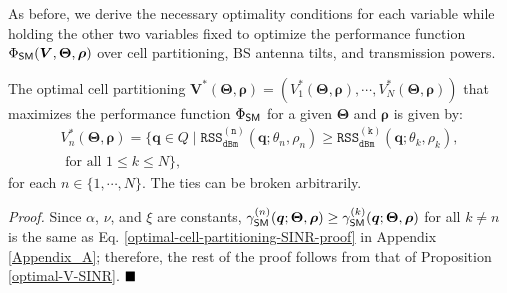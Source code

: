 As before, we derive the necessary optimality conditions for each variable while holding the other two variables fixed to optimize the performance function $\Phi_{{\sf SM}}(\bm{V}, \mathbf{\Theta}, \bm{\rho})$ over cell partitioning, BS antenna tilts, and transmission powers.
\begin{Proposition}\label{optimal-cell-partitioning-SM-performance}
    The optimal cell partitioning $\bm{V}^*(\bm{\Theta}, \bm{\rho}) = \left(V_1^*(\bm{\Theta}, \bm{\rho}), \cdots, V_N^*(\bm{\Theta}, \bm{\rho}) \right)$ that maximizes the performance function $\Phi_{{\sf SM}}$ for a given $\bm{\Theta}$ and $\bm{\rho}$ is given by:
\begin{multline}\label{optimal-cell-partitioning-SM}
   \!\!\!\!\! V_n^*(\bm{\Theta}, \bm{\rho}) = \big\{\bm{q} \in Q \mid \mathtt{RSS_{dBm}^{(n)}}(\bm{q}; \theta_n, \rho_n) \geq \mathtt{RSS_{dBm}^{(k)}}(\bm{q}; \theta_k, \rho_k), \\ \textrm{ for all } 1 \leq k \leq N \big\},
\end{multline}  
for each $n \in \{1, \cdots, N\}$. The ties can be broken arbitrarily.
\end{Proposition}
\textit{Proof. }
Since $\alpha$, $\nu$, and $\xi$ are constants, $\gamma_{\sf SM}^{(n)}(\bm{q}; \mathbf{\Theta}, \bm{\rho}) \geq \gamma_{\sf SM}^{(k)}(\bm{q}; \mathbf{\Theta}, \bm{\rho})$ for all $k \neq n$ is the same as Eq. \eqref{optimal-cell-partitioning-SINR-proof} in Appendix \ref{Appendix_A}; therefore, the rest of the proof follows from that of Proposition \ref{optimal-V-SINR}. $\hfill\blacksquare$ 


